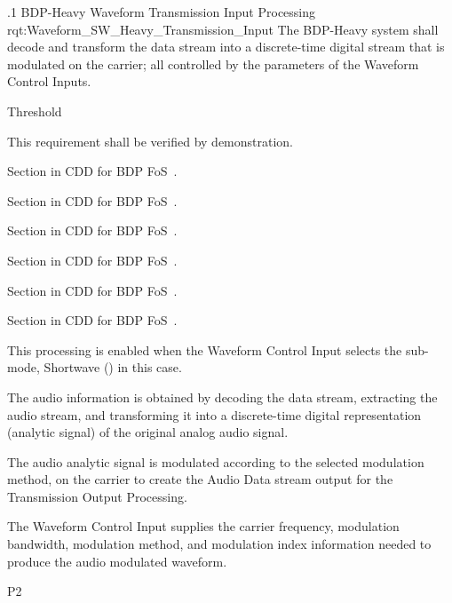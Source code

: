 \ONERQMTVKPP
{\RqtNumberBase.1}
{BDP-Heavy \SW Waveform Transmission Input Processing}
{rqt:Waveform_SW_Heavy_Transmission_Input}
{The BDP-Heavy system shall decode and transform the \MPEGTS data stream into a discrete-time digital stream that is modulated on the \RF carrier; all controlled by the parameters of the Waveform Control Inputs.}
{
	\item [Phase 1]  Threshold
}
{This requirement shall be verified by demonstration.}
{
	\item [5.1.1] Section in CDD for BDP FoS~\cite{ref__BDP_FOS_CDD}.
	\item [5.1.2] Section in CDD for BDP FoS~\cite{ref__BDP_FOS_CDD}.
	\item [5.5.1] Section in CDD for BDP FoS~\cite{ref__BDP_FOS_CDD}.
	\item [5.5.2] Section in CDD for BDP FoS~\cite{ref__BDP_FOS_CDD}.
	\item [5.5.3] Section in CDD for BDP FoS~\cite{ref__BDP_FOS_CDD}.
	\item [5.5.4] Section in CDD for BDP FoS~\cite{ref__BDP_FOS_CDD}.
}
{
	\item This processing is enabled when the Waveform Control Input selects the sub-mode, Shortwave (\SW) in this case.
	\item The audio information is obtained by decoding the \MPEGTS data stream, extracting the audio stream, and transforming it into a discrete-time digital representation (analytic signal) of the original analog audio signal.
	\item The audio analytic signal is modulated according to the selected modulation method, on the \RF carrier to create the Audio Data stream output for the Transmission Output Processing.
	\item The Waveform Control Input supplies the \RF carrier frequency, modulation bandwidth, modulation method, and modulation index information needed to produce the audio modulated \RF waveform.
}
{P2}


